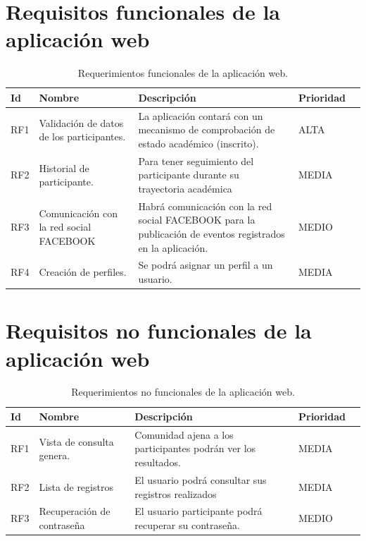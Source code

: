 	\section{Requisitos funcionales de la aplicación web}
	
	\begin{table}[htbp]
		\begin{center}
			\begin{tabular}{|l|p{45mm}|p{45mm}|p{45mm}|l}
				\hline
				Id & Nombre & Descripción & Prioridad \\
				\hline 
				RF1 & Validación de datos de los participantes. & La aplicación contará con un mecanismo de comprobación de estado académico (inscrito). & ALTA \\ \hline
				RF2 & Historial de participante. & Para tener seguimiento del participante durante su trayectoria académica & MEDIA  \\ \hline
				RF3 & Comunicación con la red social FACEBOOK &Habrá comunicación con la red social FACEBOOK para la publicación de eventos registrados en la aplicación.  & MEDIO \\ \hline
				RF4 & Creación de perfiles. & Se podrá asignar un perfil a un usuario.& MEDIA \\ \hline
			\end{tabular}
			\pagebreak
			\caption{Requerimientos funcionales de la aplicación web.}
			\label{tabla:sencilla}
		\end{center}
	\end{table}
	
	
	\section{Requisitos no funcionales de la aplicación web}
	
	\begin{table}[htbp]
		\begin{center}
			\begin{tabular}{|l|p{45mm}|p{45mm}|p{45mm}|l}
				\hline
				Id & Nombre & Descripción & Prioridad \\
				\hline 
				RF1 & Vista de consulta genera. & Comunidad ajena a los participantes podrán ver los resultados. & MEDIA \\ \hline
				RF2 & Lista de registros &El usuario podrá consultar sus registros realizados & MEDIA   \\ \hline
				RF3 & Recuperación de contraseña &El usuario participante podrá recuperar su contraseña. & MEDIO \\ \hline
			\end{tabular}
			\caption{Requerimientos no funcionales de la aplicación web.}
			\label{tabla:sencilla}
		\end{center}
	\end{table}
	
